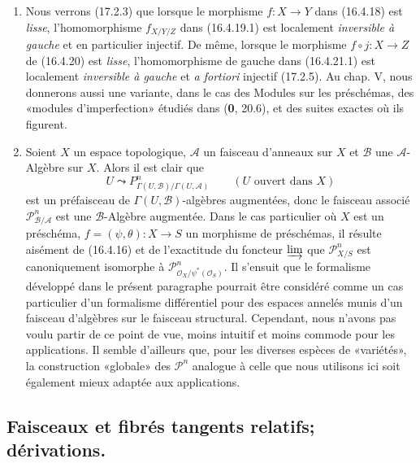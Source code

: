 \begin{remarks}[16.4.24]
\label{IV.16.4.24}
\begin{enumerate}
\item[(i)] Nous verrons (17.2.3) que lorsque le morphisme $f:X\to Y$ dans
(16.4.18) est \emph{lisse}, l'homomorphisme $f_{X/Y/Z}$ dans (16.4.19.1) est
localement \emph{inversible à gauche} et en particulier injectif. De même,
lorsque le morphisme $f\circ j:X\to Z$ de (16.4.20) est \emph{lisse},
l'homomorphisme de gauche dans (16.4.21.1) est localement
\emph{inversible à gauche} et \emph{a fortiori} injectif (17.2.5). Au chap. V,
nous donnerons aussi une variante, dans le cas des Modules sur les
préschémas, des «modules d'imperfection» étudiés dans (\textbf{0}, 20.6), et des suites
exactes où ils figurent.

\item[(ii)] Soient $X$ un espace topologique, $\mathscr{A}$ un faisceau
d'anneaux sur $X$ et $\mathscr{B}$ une $\mathscr{A}$-Algèbre sur $X$. Alors il
est clair que
\[
  U\leadsto
  P_{\Gamma(U,\mathscr{B})/\Gamma(U,\mathscr{A})}^n
  \qquad (U\text{ ouvert dans }X)
\]
est un préfaisceau de $\Gamma(U,\mathscr{B})$-algèbres augmentées, donc le
faisceau associé $\mathscr{P}_{\mathscr{B}/\mathscr{A}}^n$ est une
$\mathscr{B}$-Algèbre augmentée. Dans le cas particulier où $X$ est un
préschéma, $f=(\psi,\theta):X\to S$ un morphisme de préschémas, il résulte
aisément de (16.4.16) et de l'exactitude du foncteur $\varinjlim$ que
$\mathscr{P}_{X/S}^n$ est canoniquement isomorphe à
$\mathscr{P}_{\mathcal{O}_X/\psi^*(\mathcal{O}_S)}^n$. Il s'ensuit que le
formalisme développé dans le présent paragraphe pourrait être considéré comme
un
cas particulier d'un formalisme différentiel pour des espaces annelés munis
d'un faisceau d'algèbres sur le faisceau structural. Cependant, nous n'avons
pas voulu partir de ce point de vue, moins intuitif et moins commode pour les
applications. Il semble d'ailleurs que, pour les diverses espèces de
«variétés», la construction «globale» des $\mathscr{P}^n$ analogue à celle que
nous utilisons ici soit également mieux adaptée aux applications.
\end{enumerate}
\end{remarks}

\subsection{Faisceaux et fibrés tangents relatifs; dérivations.}

